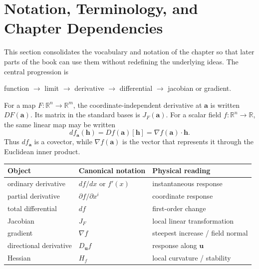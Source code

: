 \section{Notation, Terminology, and Chapter Dependencies}
\label{sec:ch2-repository-integration}

This section consolidates the vocabulary and notation of the chapter so that
later parts of the book can use them without redefining the underlying ideas.
The central progression is
\begin{center}
\gls{function} $\longrightarrow$ \gls{limit} $\longrightarrow$
\gls{derivative} $\longrightarrow$ \gls{differential} $\longrightarrow$
\gls{jacobian} or \gls{gradient}.
\end{center}


\begin{bookrule}
For a map $F:\mathbb R^n\to\mathbb R^m$, the coordinate-independent derivative
at $\mathbf a$ is written $DF(\mathbf a)$.  Its matrix in the standard bases is
$J_F(\mathbf a)$.  For a scalar field $f:\mathbb R^n\to\mathbb R$, the same
linear map may be written
\[
 df_{\mathbf a}(\mathbf h)=Df(\mathbf a)[\mathbf h]
 =\nabla f(\mathbf a)\cdot\mathbf h.
\]
Thus $df_{\mathbf a}$ is a covector, while $\nabla f(\mathbf a)$ is the vector
that represents it through the Euclidean inner product.
\end{bookrule}

\begin{center}
\begin{tabular}{@{}lll@{}}
\toprule
Object & Canonical notation & Physical reading\\
\midrule
ordinary derivative & $df/dx$ or $f'(x)$ & instantaneous response\\
partial derivative & $\partial f/\partial x^i$ & coordinate response\\
total differential & $df$ & first-order change\\
Jacobian & $J_F$ & local linear transformation\\
gradient & $\nabla f$ & steepest increase / field normal\\
directional derivative & $D_{\mathbf u}f$ & response along $\mathbf u$\\
Hessian & $H_f$ & local curvature / stability\\
\bottomrule
\end{tabular}
\end{center}

